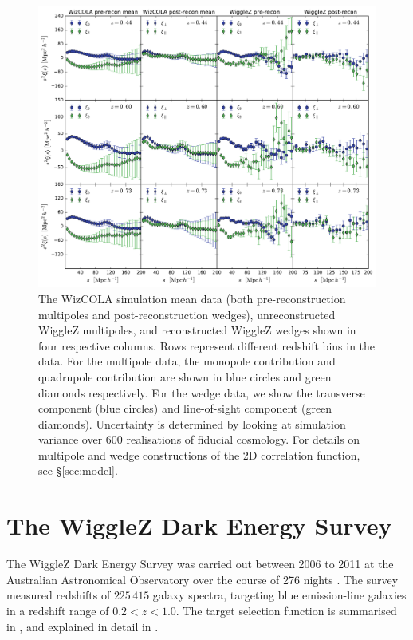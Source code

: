 \documentclass[a4paper,fleqn,usenatbib]{mnras}
\begin{document}
\begin{figure}
	\begin{center}
		\includegraphics[width=\textwidth]{dataplot.pdf}
	\end{center}
	\caption{The WizCOLA simulation mean data \citep{KazinKoda2014,KodaBlake2015} (both pre-reconstruction multipoles and post-reconstruction wedges), unreconstructed WiggleZ multipoles, and reconstructed WiggleZ wedges shown in four respective columns. Rows represent different redshift bins in the data. For the multipole data, the monopole contribution and quadrupole contribution are shown in blue circles and green diamonds respectively. For the wedge data, we show the transverse component (blue circles) and line-of-sight component (green diamonds). Uncertainty is determined by looking at simulation variance over 600 realisations of fiducial cosmology. For details on multipole and wedge constructions of the 2D correlation function, see \S\ref{sec:model}.}
	\label{fig:wizcola}
\end{figure}


\section{The WiggleZ Dark Energy Survey}\label{sect:wigglez}

The WiggleZ Dark Energy Survey was carried out between 2006 to 2011 at the Australian Astronomical Observatory over the course of 276 nights \citep{Drinkwater2010}. The survey measured redshifts of $225\,415$ galaxy spectra, targeting blue emission-line galaxies in a redshift range of $0.2 < z < 1.0$. The target selection function is summarised in \citet{BlakeDavis2011}, and explained in detail in \citet{BlakeBrough2010}. 
\end{document}
